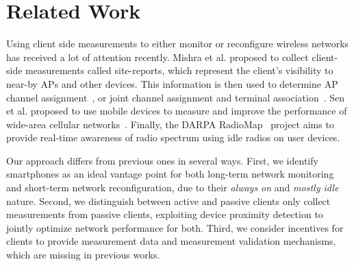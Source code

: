 \section{Related Work}
\label{sec:related}

Using client side measurements to either monitor or reconfigure wireless
networks has received a lot of attention recently. Mishra et al. proposed to
collect client-side measurements called site-reports, which represent the
client's visibility to near-by APs and other devices. This information is
then used to determine AP channel
assignment~\cite{mishra:mccr2005,dasilva:mswim2008,mishra:mobicom2006}, or
joint channel assignment and terminal association~\cite{mishra:infocom2006}.
Sen et al. proposed to use mobile devices to measure and improve the
performance of wide-area cellular networks~\cite{sen2011can}. Finally, the
DARPA RadioMap~\cite{radiomap} project aims to provide real-time awareness of
radio spectrum using idle radios on user devices.

Our approach differs from previous ones in several ways. First, we identify
smartphones as an ideal vantage point for both long-term network monitoring
and short-term network reconfiguration, due to their \textit{always on} and
\textit{mostly idle} nature. Second, we distinguish between active and
passive clients only collect measurements from passive clients, exploiting
device proximity detection to jointly optimize network performance for both.
Third, we consider incentives for clients to provide measurement data and
measurement validation mechanisms, which are missing in previous works.

